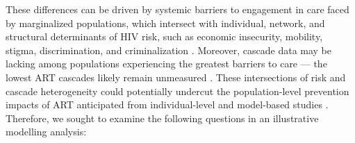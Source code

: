 These differences can be driven by
systemic barriers to engagement in care faced by marginalized populations,
which intersect with individual, network, and structural determinants of HIV risk,
such as economic insecurity, mobility, stigma, discrimination, and criminalization
\cite{Wanyenze2016,Schwartz2017,Schmidt-Sane2022}.
Moreover, cascade data may be lacking among populations experiencing the greatest barriers to care
--- \ie the lowest ART cascades likely remain unmeasured \cite{Hakim2018,Boothe2021}.
These intersections of risk and cascade heterogeneity
could potentially undercut the population-level prevention impacts of ART
anticipated from individual-level and model-based studies \cite{Baral2019}.
Therefore, we sought to examine the following questions
in an illustrative modelling analysis:
